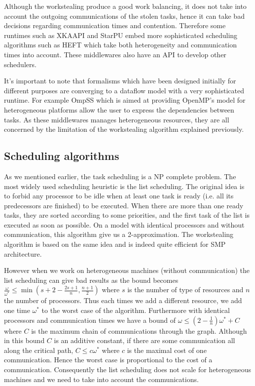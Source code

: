 \documentclass[10pt, conference, compsocconf]{IEEEtran}
\begin{document}
Although the workstealing produce a good work balancing, it does not take
into account the outgoing communications of the stolen tasks, hence it can
take bad decisions regarding communication times and contention.  Therefore
some runtimes such as XKAAPI\cite{gautierxkaapi} and
StarPU\cite{augonnet2011starpu} embed more sophisticated scheduling
algorithms such as HEFT which take both heterogeneity and communication times
into account.  These middlewares also have an API to develop other
schedulers.

It's important to note that formalisms which have been designed initially for
different purposes are converging to a dataflow model with a very
sophisticated runtime. For example OmpSS which is aimed at providing OpenMP's
model for heterogeneous platforms allow the user to express the dependencies
between tasks. As these middlewares manages heterogeneous resources, they
are all concerned by the limitation of the workstealing algorithm explained
previously.

\subsection{Scheduling algorithms} \label{sec:soa-sched}

As we mentioned earlier, the task scheduling is a NP complete
problem\cite{ullman1975np}. The most widely used scheduling heuristic is the
list scheduling\cite{GrahamRL1966Bounds,GrahamRL1969Bounds}. The original
idea is to forbid any processor to be idle when at least one task is ready
(i.e.  all its predecessors are finished) to be executed. When there are more
than one ready tasks, they are sorted according to some priorities, and the
first task of the list is executed as soon as possible. On a model with
identical processors and without communication, this algorithm give us a
2-approximation.  The workstealing algorithm is based on the same idea and is
indeed quite efficient for SMP architecture.

However when we work on heterogeneous machines (without communication) the
list scheduling can give bad results as the bound becomes
$\frac{\omega}{\omega^*}\leq\min(s+2-\frac{2s+1}{n},\frac{n+1}{2})$
\cite{garey1975bounds} where $s$ is the number of type of resources and $n$
the number of processors. Thus each
times we add a different resource, we add one time $\omega^*$ to the worst
case of the algorithm. Furthermore with identical processors and
communication times we have a bound of $\omega\leq(2-\frac{1}{n})\omega^*+C$
\cite{hwang1989scheduling} where $C$ is the maximum chain of communications
through the graph. Although in this bound $C$ is an additive constant, if
there are some communication all along the critical path, $C \leq c\omega^*$
where $c$ is the maximal cost of one communication.  Hence the worst case is
proportional to the cost of a communication.  Consequently the list scheduling
does not scale for heterogeneous machines and we need to take into account the
communications.
\end{document}
